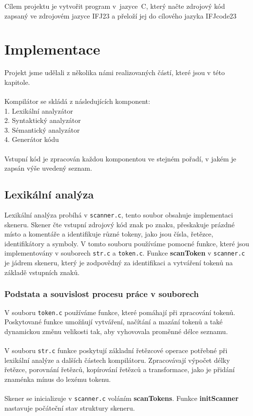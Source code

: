 \documentclass[a4paper, 11pt]{article}
\begin{document}
	Cílem projektu je vytvořit program v~jazyce~C, který načte zdrojový kód zapsaný ve zdrojovém jazyce IFJ23
    a přeloží jej do cílového jazyka IFJcode23

	\section{Implementace}
        Projekt jsme udělali z několika námi realizovaných částí, které jsou v této kapitole. \\
        \\
	Kompilátor se skládá z následujících komponent: \\
        1. Lexikální analyzátor \\
        2. Syntaktický analyzátor \\
        3. Sémantický analyzátor  \\
        4. Generátor kódu \\
        \\
        Vstupní kód je zpracován každou komponentou ve stejném pořadí, v jakém je zapsán
        výše uvedený seznam.


	\subsection{Lexikální analýza}

        Lexikální analýza probíhá v \texttt{scanner.c}, tento soubor obsahuje implementaci skeneru.
        Skener čte vstupní zdrojový kód znak po znaku, přeskakuje prázdné místo a komentáře a identifikuje různé tokeny, jako jsou čísla, řetězce, identifikátory a symboly. V tomto souboru používáme pomocné funkce, které jsou implementovány v souborech \texttt{str.c} a \texttt{token.c}.
        Funkce \textbf{scanToken} v \texttt{scanner.c} je jádrem skeneru, který je zodpovědný za identifikaci a vytváření tokenů na základě vstupních znaků.
        

        \subsubsection{ Podstata a souvislost procesu práce v souborech }
        V souboru \texttt{token.c} používáme funkce, které pomáhají při zpracování tokenů. Poskytované funkce umožňují vytváření, načítání a mazání tokenů a také dynamickou změnu velikosti tak, aby vyhovovala proměnné délce seznamu.\\
        \\
        V souboru \texttt{str.c} funkce poskytují základní řetězcové operace potřebné při lexikální analýze a dalších částech kompilátoru. Zpracovávají výpočet délky řetězce, porovnání řetězců, kopírování řetězců a transformace, jako je přidání znaménka mínus do lexému tokenu.\\
        \\
        Skener se inicializuje v \texttt{scanner.c} voláním \textbf{scanTokens}.
        Funkce \textbf{initScanner} nastavuje počáteční stav struktury skeneru.
        
\end{document}

